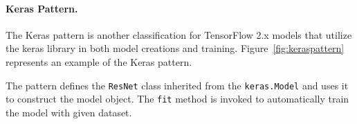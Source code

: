 


\paragraph{Keras Pattern.}
The Keras pattern is another classification for TensorFlow 2.x models that
utilize the keras library in both model creations and training. 
Figure~\ref{fig:keraspattern} represents an example of the Keras pattern.
\begin{inred}
The pattern defines the {\tt ResNet} class inherited from the {\tt keras.Model}
and uses it to construct the model object.
The {\tt fit} method is invoked to automatically train the model with
given dataset.
\end{inred}


